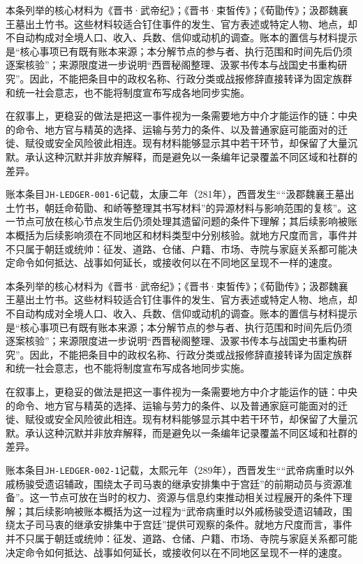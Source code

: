 本条列举的核心材料为《晋书·武帝纪》；《晋书·束皙传》；《荀勖传》；汲郡魏襄王墓出土竹书。这些材料较适合钉住事件的发生、官方表述或特定人物、地点，却不自动构成对全境人口、收入、兵数、信仰或动机的调查。账本的置信与材料提示是“核心事项已有既有账本来源；本分解节点的参与者、执行范围和时间先后仍须逐案核验”；来源限度进一步说明“西晋秘阁整理、汲冢书传本与战国史书重构研究”。因此，不能把条目中的政权名称、行政分类或战报修辞直接转译为固定族群和统一社会意志，也不能将制度宣布写成各地同步实施。

在叙事上，更稳妥的做法是把这一事件视为一条需要地方中介才能运作的链：中央的命令、地方官与精英的选择、运输与劳力的条件、以及普通家庭可能面对的迁徙、赋役或安全风险彼此相连。现有材料能够显示其中若干环节，却保留了大量沉默。承认这种沉默并非放弃解释，而是避免以一条编年记录覆盖不同区域和社群的差异。

账本条目\texttt{JH-LEDGER-001-6}记载，太康二年（281年），西晋发生““汲郡魏襄王墓出土竹书，朝廷命荀勖、和峤等整理其书写材料”的异源材料与影响范围的复核”。这一节点可放在核心节点发生后仍须处理其遗留问题的条件下理解；其后续影响被账本概括为后续影响须在不同地区和材料类型中分别核验。就地方尺度而言，事件并不只属于朝廷或统帅：征发、道路、仓储、户籍、市场、寺院与家庭关系都可能决定命令如何抵达、战事如何延长，或接收何以在不同地区呈现不一样的速度。

本条列举的核心材料为《晋书·武帝纪》；《晋书·束皙传》；《荀勖传》；汲郡魏襄王墓出土竹书。这些材料较适合钉住事件的发生、官方表述或特定人物、地点，却不自动构成对全境人口、收入、兵数、信仰或动机的调查。账本的置信与材料提示是“核心事项已有既有账本来源；本分解节点的参与者、执行范围和时间先后仍须逐案核验”；来源限度进一步说明“西晋秘阁整理、汲冢书传本与战国史书重构研究”。因此，不能把条目中的政权名称、行政分类或战报修辞直接转译为固定族群和统一社会意志，也不能将制度宣布写成各地同步实施。

在叙事上，更稳妥的做法是把这一事件视为一条需要地方中介才能运作的链：中央的命令、地方官与精英的选择、运输与劳力的条件、以及普通家庭可能面对的迁徙、赋役或安全风险彼此相连。现有材料能够显示其中若干环节，却保留了大量沉默。承认这种沉默并非放弃解释，而是避免以一条编年记录覆盖不同区域和社群的差异。

账本条目\texttt{JH-LEDGER-002-1}记载，太熙元年（289年），西晋发生““武帝病重时以外戚杨骏受遗诏辅政，围绕太子司马衷的继承安排集中于宫廷”的前期动员与资源准备”。这一节点可放在当时的权力、资源与信息约束推动相关过程展开的条件下理解；其后续影响被账本概括为这一过程为“武帝病重时以外戚杨骏受遗诏辅政，围绕太子司马衷的继承安排集中于宫廷”提供可观察的条件。就地方尺度而言，事件并不只属于朝廷或统帅：征发、道路、仓储、户籍、市场、寺院与家庭关系都可能决定命令如何抵达、战事如何延长，或接收何以在不同地区呈现不一样的速度。

